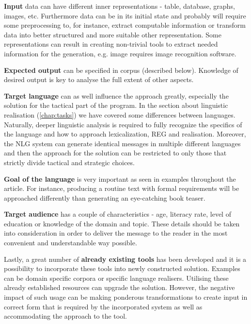 \textbf{Input} data can have different inner representations - table, database, graphs, images, etc. Furthermore data can be in its initial state and probably will require some preprocessing to, for instance, extract computable information or transform data into better structured and more suitable other representation. Some representations can result in creating non-trivial tools to extract needed information for the generation, e.g. image requires image recognition software.

\textbf{Expected output} can be specified in corpus (described below). Knowledge of desired output is key to analyse the full extent of other aspects.

\textbf{Target language} can as well influence the approach greatly, especially the solution for the tactical part of the program. In the section about linguistic realisation (\autoref{chap:tasks}) we have covered some differences between languages. Naturally, deeper linguistic analysis is required to fully recognize the specifics of the language and how to approach lexicalization, REG and realisation. Moreover, the NLG system can generate identical messages in multiple different languages and then the approach for the solution can be restricted to only those that strictly divide tactical and strategic choices.

\textbf{Goal of the language} is very important as seen in examples throughout the article. For instance, producing a routine text with formal requirements will be approached differently than generating an eye-catching book teaser.

\textbf{Target audience} has a couple of characteristics - age, literacy rate, level of education or knowledge of the domain and topic. These details should be taken into consideration in order to deliver the message to the reader in the most convenient and understandable way possible. 

Lastly, a great number of \textbf{already existing tools} has been developed and it is a possibility to incorporate these tools into newly constructed solution. Examples can be domain specific corpora or specific language realisers. Utilising these already established resources can upgrade the solution. However, the negative impact of such usage can be making ponderous transformations to create input in correct form that is required by the incorporated system as well as accommodating the approach to the tool.
 
